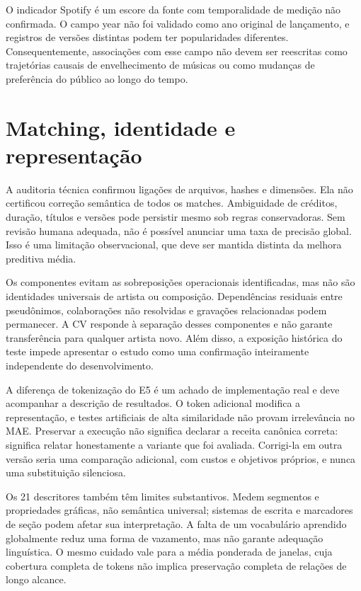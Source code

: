 O indicador Spotify é um escore da fonte com temporalidade de medição não confirmada. O campo year não foi validado como ano original de lançamento, e registros de versões distintas podem ter popularidades diferentes. Consequentemente, associações com esse campo não devem ser reescritas como trajetórias causais de envelhecimento de músicas ou como mudanças de preferência do público ao longo do tempo.

\section{Matching, identidade e representação}
A auditoria técnica confirmou ligações de arquivos, hashes e dimensões. Ela não certificou correção semântica de todos os matches. Ambiguidade de créditos, duração, títulos e versões pode persistir mesmo sob regras conservadoras. Sem revisão humana adequada, não é possível anunciar uma taxa de precisão global. Isso é uma limitação observacional, que deve ser mantida distinta da melhora preditiva média.

Os componentes evitam as sobreposições operacionais identificadas, mas não são identidades universais de artista ou composição. Dependências residuais entre pseudônimos, colaborações não resolvidas e gravações relacionadas podem permanecer. A CV responde à separação desses componentes e não garante transferência para qualquer artista novo. Além disso, a exposição histórica do teste impede apresentar o estudo como uma confirmação inteiramente independente do desenvolvimento.

A diferença de tokenização do E5 é um achado de implementação real e deve acompanhar a descrição de resultados. O token adicional modifica a representação, e testes artificiais de alta similaridade não provam irrelevância no MAE. Preservar a execução não significa declarar a receita canônica correta: significa relatar honestamente a variante que foi avaliada. Corrigi-la em outra versão seria uma comparação adicional, com custos e objetivos próprios, e nunca uma substituição silenciosa.

Os 21 descritores também têm limites substantivos. Medem segmentos e propriedades gráficas, não semântica universal; sistemas de escrita e marcadores de seção podem afetar sua interpretação. A falta de um vocabulário aprendido globalmente reduz uma forma de vazamento, mas não garante adequação linguística. O mesmo cuidado vale para a média ponderada de janelas, cuja cobertura completa de tokens não implica preservação completa de relações de longo alcance.

